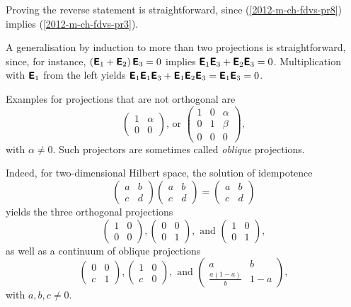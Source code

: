 {Proving the reverse statement is straightforward, since (\ref{2012-m-ch-fdvs-pr8}) implies  (\ref{2012-m-ch-fdvs-pr3}).

A generalisation by induction to more than two projections is straightforward,
since, for instance,
$\left(\textsf{\textbf{E}}_1+\textsf{\textbf{E}}_2\right)\textsf{\textbf{E}}_3=0$
implies
$ \textsf{\textbf{E}}_1\textsf{\textbf{E}}_3+\textsf{\textbf{E}}_2\textsf{\textbf{E}}_3=0$.
Multiplication with $\textsf{\textbf{E}}_1$ from the left yields
$
\textsf{\textbf{E}}_1\textsf{\textbf{E}}_1\textsf{\textbf{E}}_3+\textsf{\textbf{E}}_1\textsf{\textbf{E}}_2\textsf{\textbf{E}}_3=
\textsf{\textbf{E}}_1 \textsf{\textbf{E}}_3=
0$.
 \eproof }


{\color{blue}
\bexample
Examples for projections that are not orthogonal are
$$\begin{pmatrix}
1&\alpha \\
0&0
\end{pmatrix}
\text{,  or }
\begin{pmatrix}
1&0&\alpha \\
0&1&\beta \\
0&0&0
\end{pmatrix},$$
with $\alpha \neq 0$.
Such projectors are sometimes called
{\em oblique} projections.
\eexample
}


{\color{blue}
\bexample
Indeed, for two-dimensional Hilbert space, the solution
of idempotence
$$
\begin{pmatrix}
a&b \\
c&d
\end{pmatrix}
\begin{pmatrix}
a&b \\
c&d
\end{pmatrix}
=
\begin{pmatrix}
a&b \\
c&d
\end{pmatrix}
$$
yields the three orthogonal projections
$$
\begin{pmatrix}
1&0 \\
0&0
\end{pmatrix},
\begin{pmatrix}
0&0 \\
0&1
\end{pmatrix},\text{ and }
\begin{pmatrix}
1&0 \\
0&1
\end{pmatrix},
$$
as well as a continuum of oblique projections
$$
\begin{pmatrix}
0&0 \\
c&1
\end{pmatrix},
\begin{pmatrix}
1&0 \\
c&0
\end{pmatrix},\text{ and }
\begin{pmatrix}
a&b \\
\frac{a(1-a)}{b}&1-a
\end{pmatrix},
$$
with $a,b,c \neq 0$.
\eexample
}


